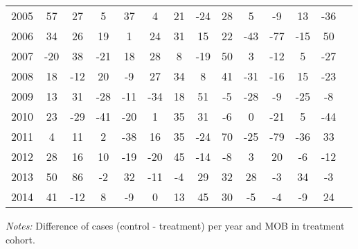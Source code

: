 \begin{table}[H]
\begin{threeparttable}
{\begin{tabular}{l*{13}{c}}
2005        &          57&          27&           5&          37&           4&          21&         -24&          28&           5&          -9&          13&         -36\\
2006        &          34&          26&          19&           1&          24&          31&          15&          22&         -43&         -77&         -15&          50\\
2007        &         -20&          38&         -21&          18&          28&           8&         -19&          50&           3&         -12&           5&         -27\\
2008        &          18&         -12&          20&          -9&          27&          34&           8&          41&         -31&         -16&          15&         -23\\
2009        &          13&          31&         -28&         -11&         -34&          18&          51&          -5&         -28&          -9&         -25&          -8\\
2010        &          23&         -29&         -41&         -20&           1&          35&          31&          -6&           0&         -21&           5&         -44\\
2011        &           4&          11&           2&         -38&          16&          35&         -24&          70&         -25&         -79&         -36&          33\\
2012        &          28&          16&          10&         -19&         -20&          45&         -14&          -8&           3&          20&          -6&         -12\\
2013        &          50&          86&          -2&          32&         -11&          -4&          29&          32&          28&          -3&          34&          -3\\
2014        &          41&         -12&           8&          -9&           0&          13&          45&          30&          -5&          -4&          -9&          24\\
 \bottomrule \end{tabular} } \begin{tablenotes} \item \scriptsize \emph{Notes:} Difference of cases (control - treatment) per year and MOB in treatment cohort. \end{tablenotes} \end{threeparttable} \end{table} 
